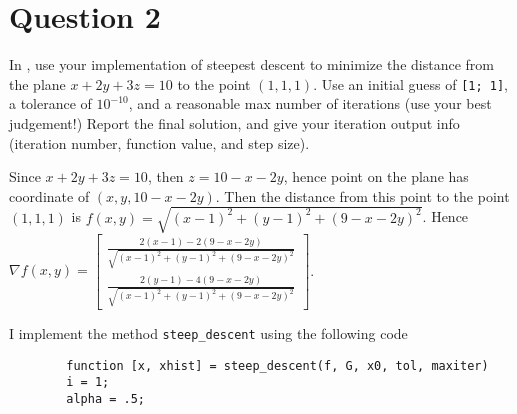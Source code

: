 \section{Question 2}

\begin{question}
    In \MATLAB, use your implementation of steepest descent to minimize the distance from the plane $x+2y+3z=10$ to the point $(1,1,1)$. Use an initial guess of \verb+[1; 1]+, a tolerance of $10^{-10}$, and a reasonable max number of iterations (use your best judgement!) Report the final solution, and give your iteration output info (iteration number, function value, and step size).
\end{question}

\begin{answer}
    Since $x + 2y + 3z = 10$, then $z = 10 - x - 2y$, hence point on the plane has coordinate of $(x,y,10 - x - 2y)$. Then the distance from this point to the point $(1,1,1)$ is $f(x,y) = \sqrt{(x-1)^2 + (y-1)^2 + (9 - x - 2y)^2}$. Hence $\nabla f(x,y) = \left[\begin{smallmatrix}\tfrac{2(x-1)-2(9-x-2y)}{\sqrt{(x-1)^2 + (y-1)^2 + (9 - x - 2y)^2}}\\\tfrac{2(y-1)-4(9-x-2y)}{\sqrt{(x-1)^2 + (y-1)^2 + (9 - x - 2y)^2}}\end{smallmatrix}\right]$.

    I implement the method \verb+steep_descent+ using the following code
    \begin{verbatim}
        function [x, xhist] = steep_descent(f, G, x0, tol, maxiter)
        i = 1;
        alpha = .5;
        

\end{verbatim}
\end{answer}
